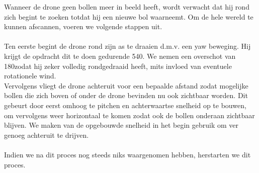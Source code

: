 \noindent
Wanneer de drone geen bollen meer in beeld heeft, wordt verwacht dat hij rond zich begint te zoeken totdat hij een nieuwe bol waarneemt. Om de hele wereld te kunnen afscannen, voeren we volgende stappen uit.
\\
\\
Ten eerste begint de drone rond zijn as te draaien d.m.v. een yaw beweging. Hij krijgt de opdracht dit te doen gedurende 540\degree. We nemen een overschot van 180\degree zodat hij zeker volledig rondgedraaid heeft, mits invloed van eventuele rotationele wind.
\\
Vervolgens vliegt de drone achteruit voor een bepaalde afstand zodat mogelijke bollen die zich boven of onder de drone bevinden nu ook zichtbaar worden. Dit gebeurt door eerst omhoog te pitchen en achterwaartse snelheid op te bouwen, om vervolgens weer horizontaal te komen zodat ook de bollen onderaan zichtbaar blijven. We maken van de opgebouwde snelheid in het begin gebruik om ver genoeg achteruit te drijven.
\\
\\
Indien we na dit proces nog steeds niks waargenomen hebben, herstarten we dit proces. 
